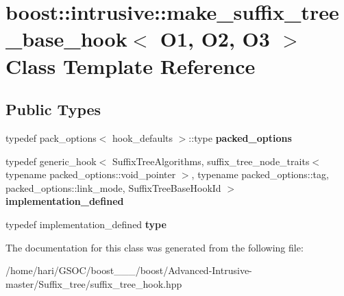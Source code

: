 \hypertarget{classboost_1_1intrusive_1_1make__suffix__tree__base__hook}{}\section{boost\+:\+:intrusive\+:\+:make\+\_\+suffix\+\_\+tree\+\_\+base\+\_\+hook$<$ O1, O2, O3 $>$ Class Template Reference}
\label{classboost_1_1intrusive_1_1make__suffix__tree__base__hook}
\subsection*{Public Types}
\begin{DoxyCompactItemize}
\item 
\mbox{\label{classboost_1_1intrusive_1_1make__suffix__tree__base__hook_addb846ee0efa5e8b70f2788c2c6c3381}} 
typedef pack\+\_\+options$<$ hook\+\_\+defaults $>$\+::type {\bfseries packed\+\_\+options}
\item 
\mbox{\label{classboost_1_1intrusive_1_1make__suffix__tree__base__hook_a21cb881040ae75027aaa684f98669d45}} 
typedef generic\+\_\+hook$<$ Suffix\+Tree\+Algorithms, suffix\+\_\+tree\+\_\+node\+\_\+traits$<$ typename packed\+\_\+options\+::void\+\_\+pointer $>$, typename packed\+\_\+options\+::tag, packed\+\_\+options\+::link\+\_\+mode, Suffix\+Tree\+Base\+Hook\+Id $>$ {\bfseries implementation\+\_\+defined}
\item 
\mbox{\label{classboost_1_1intrusive_1_1make__suffix__tree__base__hook_a72474fe783f53cf3da5ff706894eefd6}} 
typedef implementation\+\_\+defined {\bfseries type}
\end{DoxyCompactItemize}


The documentation for this class was generated from the following file\+:\begin{DoxyCompactItemize}
\item 
/home/hari/\+G\+S\+O\+C/boost\+\_\+\_\+\_/boost/\+Advanced-\/\+Intrusive-\/master/\+Suffix\+\_\+tree/suffix\+\_\+tree\+\_\+hook.\+hpp\end{DoxyCompactItemize}
